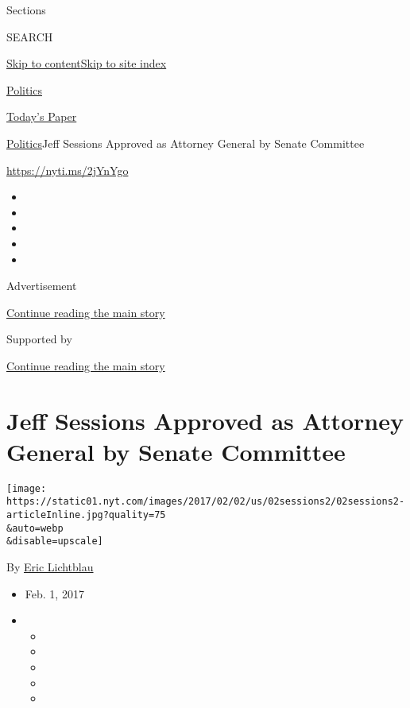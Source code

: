 Sections

SEARCH

\protect\hyperlink{site-content}{Skip to
content}\protect\hyperlink{site-index}{Skip to site index}

\href{https://www.nytimes.com/section/politics}{Politics}

\href{https://myaccount.nytimes.com/auth/login?response_type=cookie\&client_id=vi}{}

\href{https://www.nytimes.com/section/todayspaper}{Today's Paper}

\href{/section/politics}{Politics}\textbar{}Jeff Sessions Approved as
Attorney General by Senate Committee

\url{https://nyti.ms/2jYnYgo}

\begin{itemize}
\item
\item
\item
\item
\item
\end{itemize}

Advertisement

\protect\hyperlink{after-top}{Continue reading the main story}

Supported by

\protect\hyperlink{after-sponsor}{Continue reading the main story}

\hypertarget{jeff-sessions-approved-as-attorney-general-by-senate-committee}{%
\section{Jeff Sessions Approved as Attorney General by Senate
Committee}\label{jeff-sessions-approved-as-attorney-general-by-senate-committee}}

\texttt{[image: https://static01.nyt.com/images/2017/02/02/us/02sessions2/02sessions2-articleInline.jpg?quality=75\\\&auto=webp\\\&disable=upscale]}

By \href{http://www.nytimes.com/by/eric-lichtblau}{Eric Lichtblau}

\begin{itemize}
\item
  Feb. 1, 2017
\item
  \begin{itemize}
  \item
  \item
  \item
  \item
  \item
  \end{itemize}
\end{itemize}

